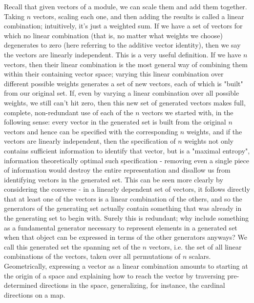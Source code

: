 \documentclass{article}
\newcommand{\nn}{\leavevmode \newline \newline}
\begin{document}
Recall that given vectors of a module, we can scale them and add them together. Taking $ n $ vectors, scaling each one, and then adding the results is called a linear combination; intuitively, it's just a weighted sum. If we have a set of vectors for which no linear combination (that is, no matter what weights we choose) degenerates to zero (here referring to the additive vector identity), then we say the vectors are linearly independent. This is a very useful definition. If we have $ n $ vectors, then their linear combination is the most general way of combining them within their containing vector space; varying this linear combination over different possible weights generates a set of new vectors, each of which is "built" from our original set. If, even by varying a linear combination over all possible weights, we still can't hit zero, then this new set of generated vectors makes full, complete, non-redundant use of each of the $ n $ vectors we started with, in the following sense: every vector in the generated set is built from the original $ n $ vectors and hence can be specified with the corresponding $ n $ weights, and if the vectors are linearly independent, then the specification of $ n $ weights not only contains sufficient information to identify that vector, but is a "maximal entropy", information theoretically optimal such specification - removing even a single piece of information would destroy the entire representation and disallow us from identifying vectors in the generated set. This can be seen more clearly by considering the converse - in a linearly dependent set of vectors, it follows directly that at least one of the vectors is a linear combination of the others, and so the generators of the generating set actually contain something that was already in the generating set to begin with. Surely this is redundant; why include something as a fundamental generator necessary to represent elements in a generated set when that object can be expressed in terms of the other generators anyways? We call this generated set the spanning set of the $ n $ vectors, i.e. the set of all linear combinations of the vectors, taken over all permutations of $ n $ scalars. Geometrically, expressing a vector as a linear combination amounts to starting at the origin of a space and explaining how to reach the vector by traversing pre-determined directions in the space, generalizing, for instance, the cardinal directions on a map.
\nn
\end{document}
